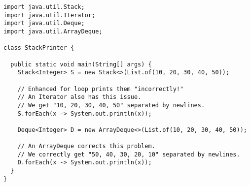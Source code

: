 \begin{lstlisting}[language=MyJava]
import java.util.Stack;
import java.util.Iterator;
import java.util.Deque;
import java.util.ArrayDeque;

class StackPrinter {

  public static void main(String[] args) {
    Stack<Integer> S = new Stack<>(List.of(10, 20, 30, 40, 50));

    // Enhanced for loop prints them "incorrectly!"
    // An Iterator also has this issue.
    // We get "10, 20, 30, 40, 50" separated by newlines.
    S.forEach(x -> System.out.println(x));

    Deque<Integer> D = new ArrayDeque<>(List.of(10, 20, 30, 40, 50));

    // An ArrayDeque corrects this problem.
    // We correctly get "50, 40, 30, 20, 10" separated by newlines.
    D.forEach(x -> System.out.println(x));
  }
}
\end{lstlisting}


